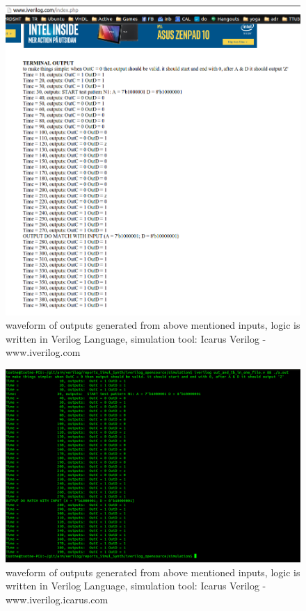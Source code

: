 \documentclass{article}
\begin{document}
\begin{figure}[H]
\centering
\includegraphics[width=\textwidth] {tb_iverilogcom.png}
\caption{waveform of outputs generated from above mentioned inputs, logic is written in Verilog Language, simulation tool: Icarus Verilog - www.iverilog.com}
\label{fig:tb_iverilogcom}
\end{figure}

\begin{figure}[H]
\centering
\includegraphics[width=\textwidth] {tb_iveriloglinux.png}
\caption{waveform of outputs generated from above mentioned inputs, logic is written in Verilog Language, simulation tool: Icarus Verilog - www.iverilog.icarus.com}
\label{fig:tb_iverloglinux}
\end{figure}




\end{document}
